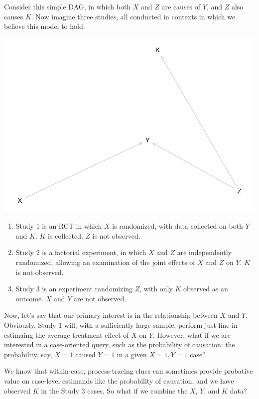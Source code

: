 \documentclass[
  12pt,
]{book}
\providecommand{\tightlist}{%
  \setlength{\itemsep}{0pt}\setlength{\parskip}{0pt}}
\begin{document}
Consider this simple DAG, in which both \(X\) and \(Z\) are causes of \(Y\), and \(Z\) also causes \(K\). Now imagine three studies, all conducted in contexts in which we believe this model to hold:

\includegraphics{ii_files/figure-latex/jigsaw-1.pdf}

\begin{enumerate}
\def\labelenumi{\arabic{enumi}.}
\tightlist
\item
  Study 1 is an RCT in which \(X\) is randomized, with data collected on both \(Y\) and \(K\). \(K\) is collected. \(Z\) is not observed.
\item
  Study 2 is a factorial experiment, in which \(X\) and \(Z\) are independently randomized, allowing an examination of the joint effects of \(X\) and \(Z\) on \(Y\). \(K\) is not observed.
\item
  Study 3 is an experiment randomizing \(Z\), with only \(K\) observed as an outcome. \(X\) and \(Y\) are not observed.
\end{enumerate}

Now, let's say that our primary interest is in the relationship between \(X\) and \(Y\). Obviously, Study 1 will, with a sufficiently large sample, perform just fine in estimaing the average treatment effect of \(X\) on \(Y\). However, what if we are interested in a case-oriented query, such as the probability of causation: the probability, say, \(X=1\) caused \(Y=1\) in a given \(X=1, Y=1\) case?

We know that within-case, process-tracing clues can sometimes provide probative value on case-level estimands like the probability of causation, and we have observed \(K\) in the Study 3 cases. So what if we combine the \(X\), \(Y\), and \(K\) data?
\end{document}
